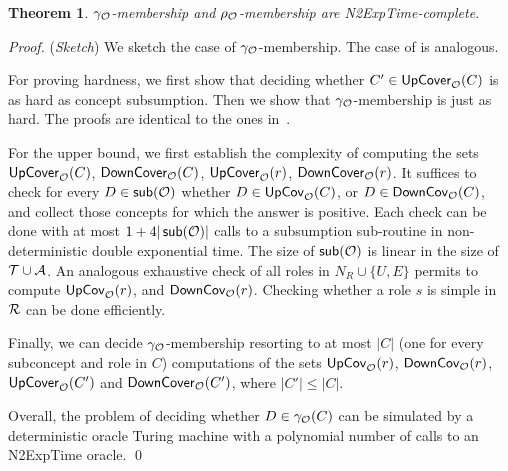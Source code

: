 \documentclass[
]{ceurart}
\newtheorem{theorem}{Theorem}
\begin{document}
\begin{theorem}
{\sc $\gamma_\mathcal{O}$-membership} and {\sc $\rho_\mathcal{O}$-membership} are N2ExpTime-complete.
\end{theorem}

\begin{proof}(\emph{Sketch}) 
We sketch the case of {\sc $\gamma_\mathcal{O}$-membership}. The case of is analogous.

For proving hardness, we first show that deciding whether $C' \in \mathsf{UpCover}_\mathcal{O}(C)$ is as hard 
as concept subsumption. Then we show that 
{\sc $\gamma_\mathcal{O}$\mbox{-}membership} is just as hard. The proofs are identical to the ones in~\cite{troquard2018repairing}.



For the upper bound, we first establish the complexity of computing the sets $\mathsf{UpCover}_\mathcal{O}(C)$, $\mathsf{DownCover}_\mathcal{O}(C)$, $\mathsf{UpCover}_\mathcal{O}(r)$, $\mathsf{DownCover}_\mathcal{O}(r)$.
%
It suffices to check for every $D \in \mathop{\mathsf{sub}}(\mathcal{O})$ whether $D \in \mathsf{UpCov}_\mathcal{O}(C)$, or $D \in \mathsf{DownCov}_\mathcal{O}(C)$, and collect 
those concepts for which the answer is positive.
%
Each check can be done with at most $1 + 4|\mathop{\mathsf{sub}}(\mathcal{O})|$ calls to a \SROIQ subsumption sub-routine in non-deterministic double exponential time.
%
The size of $\mathop{\mathsf{sub}}(\mathcal{O})$ is linear in the size of $\mathcal{T} \cup \mathcal{A}$.
%
An analogous exhaustive check of all roles in $N_R \cup \{U,E\}$ permits to compute 
$\mathsf{UpCov}_\mathcal{O}(r)$, and $\mathsf{DownCov}_\mathcal{O}(r)$. Checking whether a role $s$ is simple in $\mathcal{R}$ can be done efficiently.
%



Finally, we can decide 
{\sc $\gamma_\mathcal{O}$\mbox{-}membership} resorting to at most $|C|$ (one for every subconcept and role in $C$) computations of the sets
$\mathsf{UpCov}_\mathcal{O}(r)$, $\mathsf{DownCov}_\mathcal{O}(r)$, $\mathsf{UpCover}_\mathcal{O}(C')$ and $\mathsf{DownCover}_\mathcal{O}(C')$, where $|C'| \leq |C|$. %

Overall, the problem of deciding whether $D \in \gamma_\mathcal{O}(C)$ can be simulated by a deterministic oracle Turing machine with a polynomial number of calls to an N2ExpTime oracle.
\qed\end{proof}
\end{document}
